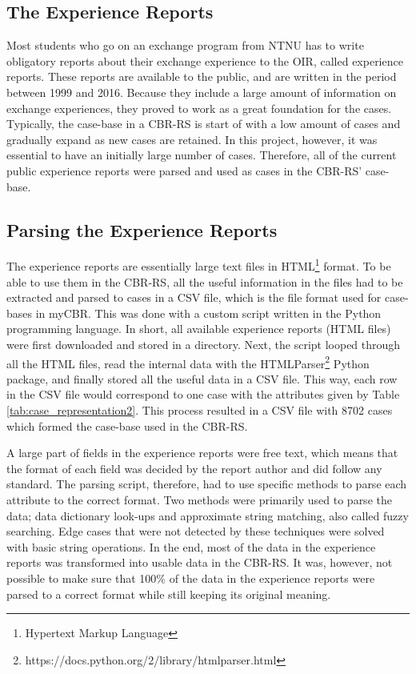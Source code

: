\subsection{The Experience Reports}\label{sec:experience_reports}
Most students who go on an exchange program from NTNU has to write obligatory reports about their exchange experience to the OIR, called experience reports. These reports are available to the public, and are written in the period between 1999 and 2016. Because they include a large amount of information on exchange experiences, they proved to work as a great foundation for the cases. Typically, the case-base in a CBR-RS is start of with a low amount of cases and gradually expand as new cases are retained. In this project, however, it was essential to have an initially large number of cases. Therefore, all of the current public experience reports were parsed and used as cases in the CBR-RS' case-base. 

\subsection{Parsing the Experience Reports}\label{sec:parsing_experience_reports}

The experience reports are essentially large text files in HTML\footnote{Hypertext Markup Language} format. To be able to use them in the CBR-RS, all the useful information in the files had to be extracted and parsed to cases in a CSV file, which is the file format used for case-bases in myCBR. This was done with a custom script written in the Python programming language. In short, all available experience reports (HTML files) were first downloaded and stored in a directory. Next, the script looped through all the HTML files, read the internal data with the HTMLParser\footnote{https://docs.python.org/2/library/htmlparser.html} Python package, and finally stored all the useful data in a CSV file. This way, each row in the CSV file would correspond to one case with the attributes given by Table \ref{tab:case_representation2}. This process resulted in a CSV file with 8702 cases which formed the case-base used in the CBR-RS.

A large part of fields in the experience reports were free text, which means that the format of each field was decided by the report author and did follow any standard. The parsing script, therefore, had to use specific methods to parse each attribute to the correct format. Two methods were primarily used to parse the data; data dictionary look-ups and approximate string matching, also called fuzzy searching. Edge cases that were not detected by these techniques were solved with basic string operations. In the end, most of the data in the experience reports was transformed into usable data in the CBR-RS. It was, however, not possible to make sure that 100\% of the data in the experience reports were parsed to a correct format while still keeping its original meaning.

